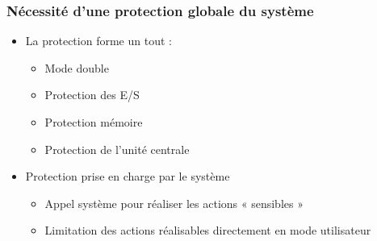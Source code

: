 \begin{frame}
 \frametitle{Nécessité d'une protection globale du système}
 \begin{itemize}
 \item La protection forme un tout :
\begin{itemize}
\item Mode double
\item Protection des E/S
\item Protection mémoire
\item Protection de l’unité centrale
\end{itemize}
\item Protection prise en charge par le système
\begin{itemize}
\item Appel système pour réaliser les actions « sensibles »
\item Limitation des actions réalisables directement en mode utilisateur
\end{itemize}
 \end{itemize}
\end{frame}



